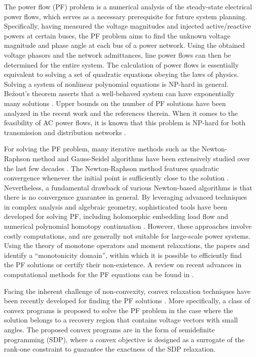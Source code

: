 \documentclass[journal,twoside]{IEEEtran}
\begin{document}
The power flow (PF) problem is a numerical analysis of the steady-state electrical power flows,
which serves as a necessary prerequisite for future system planning.
Specifically, having measured the voltage magnitudes and injected active/reactive powers at certain buses,
 the PF problem aims to find the unknown voltage magnitude and phase angle at each bus of a power network.
Using the obtained voltage phasors and the network admittances, line power flows can then be determined for the entire system.
The calculation of power flows is essentially equivalent to solving a set of quadratic equations obeying the laws of physics.
Solving a system of nonlinear polynomial equations is NP-hard in general.
Be\'{z}out's theorem asserts that a well-behaved system can have exponentially many solutions \cite{Hartshorne77}.
Upper bounds on the number of PF solutions have been analyzed in the recent work \cite{MolzahnACC16} and the references therein.
When it comes to the feasibility of AC power flows, it is known that this problem is NP-hard for both transmission and distribution networks \cite{Bienstock15,Lehmann16}.

For solving the PF problem, many iterative methods such as the Newton-Raphson method and Gauss-Seidel algorithms have been extensively studied over the last few decades \cite{Bergen00}.
The Newton-Raphson method features quadratic convergence whenever the initial point is sufficiently close to the solution \cite{Tinney67,Stott74}.
Nevertheless, a fundamental drawback of various Newton-based algorithms is that there is no convergence guarantee in general. By leveraging advanced techniques in complex analysis and algebraic geometry,
sophisticated tools have been developed for solving PF, including holomorphic embedding load flow
and numerical polynomial homotopy continuation  \cite{Trias12,Li03}.
However, these approaches  involve costly computations, and are generally not suitable for large-scale power systems.
Using the theory of monotone operators and moment relaxations, the papers \cite{DJcdc15} and \cite{DJ15} identify
a ``monotonicity domain'', within which it is possible to efficiently find the PF solutions or certify their non-existence.
A review on recent advances in computational methods for the PF equations can be found in \cite{Mehta15a}.

Facing the inherent challenge of non-convexity, convex relaxation techniques have been recently developed for finding the PF solutions \cite{Madani15CDC}.
More specifically, a class of convex programs is proposed to solve the PF problem in the case where the solution belongs to a recovery region that contains voltage vectors with small angles.
The proposed convex programs are in the form of semidefinite programming (SDP), where a convex objective
is designed as a surrogate of the rank-one constraint to guarantee the exactness of the SDP relaxation.
\end{document}
